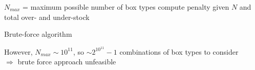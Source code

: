 \begin{frame}
\begin{algorithm}[H]
	\begin{algorithmic}[1] %
		\State $N_{max}$ = maximum possible number of box types
				\State compute penalty given $N$ and total over- and under-stock
			\EndFor
		\EndFor
	\end{algorithmic}
	\caption{Brute-force algorithm}
\end{algorithm}
However, $N_{max} \sim 10^{11}$, so $\sim 2^{10^{11}} - 1$ combinations of box types to consider\\
$\Rightarrow$ brute force approach unfeasible
\end{frame}
